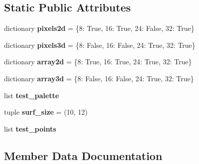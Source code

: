 \subsection*{Static Public Attributes}
\begin{DoxyCompactItemize}
\item 
\mbox{\label{classpygame_1_1tests_1_1surfarray__test_1_1_surfarray_module_test_a9691267fc54779c7888c4a602f27dc20}} 
dictionary {\bfseries pixels2d} = \{8\+: True, 16\+: True, 24\+: False, 32\+: True\}
\item 
\mbox{\label{classpygame_1_1tests_1_1surfarray__test_1_1_surfarray_module_test_abc9d8dbde7fba7d00f7f4c7e438d2060}} 
dictionary {\bfseries pixels3d} = \{8\+: False, 16\+: False, 24\+: True, 32\+: True\}
\item 
\mbox{\label{classpygame_1_1tests_1_1surfarray__test_1_1_surfarray_module_test_a83845471ab72426e7c6192c9cf91034c}} 
dictionary {\bfseries array2d} = \{8\+: True, 16\+: True, 24\+: True, 32\+: True\}
\item 
\mbox{\label{classpygame_1_1tests_1_1surfarray__test_1_1_surfarray_module_test_a234daa85ee2cc3c57ee474d3d72af85c}} 
dictionary {\bfseries array3d} = \{8\+: False, 16\+: False, 24\+: True, 32\+: True\}
\item 
list {\bfseries test\+\_\+palette}
\item 
\mbox{\label{classpygame_1_1tests_1_1surfarray__test_1_1_surfarray_module_test_a430be16d8f304a31c80fc5a4e9a3d5c1}} 
tuple {\bfseries surf\+\_\+size} = (10, 12)
\item 
list {\bfseries test\+\_\+points}
\end{DoxyCompactItemize}


\subsection{Member Data Documentation}
\mbox{\label{classpygame_1_1tests_1_1surfarray__test_1_1_surfarray_module_test_a1072a0be2539d1640e6e89a36839130c}} 
